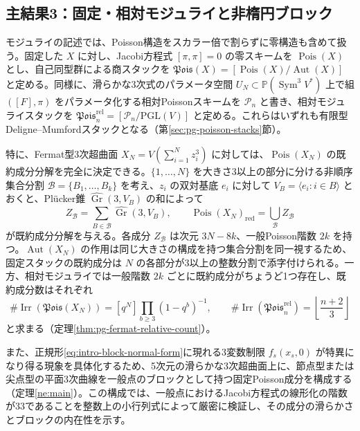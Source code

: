\subsection*{主結果3：固定・相対モジュライと非楕円ブロック}
モジュライの記述では、Poisson構造をスカラー倍で割らずに零構造も含めて扱う。固定した $X$ に対し、Jacobi方程式 $[\pi,\pi]=0$ の零スキームを $\operatorname{Pois}(X)$ とし、自己同型群による商スタックを $\mathfrak{Pois}(X)=[\operatorname{Pois}(X)/\operatorname{Aut}(X)]$ と定める。同様に、滑らかな3次式のパラメータ空間 $U_N\subset\mathbb P(\operatorname{Sym}^3V^*)$ 上で組 $([F],\pi)$ をパラメータ化する相対Poissonスキームを $\mathscr P_n$ と書き、相対モジュライスタックを $\mathfrak{Pois}^{\mathrm{rel}}_n=[\mathscr P_n/\mathrm{PGL}(V)]$ と定める。これらはいずれも有限型Deligne--Mumfordスタックとなる（第\ref{sec:pg-poisson-stacks}節）。

特に、Fermat型3次超曲面 $X_N=V(\sum_{i=1}^N z_i^3)$ に対しては、$\operatorname{Pois}(X_N)$ の既約成分分解を完全に決定できる。$\{1,\ldots,N\}$ を大きさ3以上の部分に分ける非順序集合分割 $\mathcal B=\{B_1,\ldots,B_k\}$ を考え、$z_i$ の双対基底 $e_i$ に対して $V_B=\langle e_i:i\in B\rangle$ とおくと、Pl\"ucker錐 $\widehat{\operatorname{Gr}}(3,V_B)$ の和によって
\begin{equation}\label{eq:intro-fermat-components}
Z_{\mathcal B}=\sum_{B\in\mathcal B}\widehat{\operatorname{Gr}}(3,V_B),
\qquad\operatorname{Pois}(X_N)_{\mathrm{red}}=\bigcup_{\mathcal B}Z_{\mathcal B}
\end{equation}
が既約成分分解を与える。各成分 $Z_{\mathcal B}$ は次元 $3N-8k$、一般Poisson階数 $2k$ を持つ。$\operatorname{Aut}(X_N)$ の作用は同じ大きさの構成を持つ集合分割を同一視するため、固定スタックの既約成分は $N$ の各部分が3以上の整数分割で添字付けられる。一方、相対モジュライでは一般階数 $2k$ ごとに既約成分がちょうど1つ存在し、既約成分数はそれぞれ
\begin{equation}\label{eq:intro-poisson-stack-counts}
\#\operatorname{Irr}(\mathfrak{Pois}(X_N))
=[q^N]\prod_{b\ge3}(1-q^b)^{-1},\qquad
\#\operatorname{Irr}(\mathfrak{Pois}^{\mathrm{rel}}_n)
=\left\lfloor\frac{n+2}{3}\right\rfloor
\end{equation}
と求まる（定理\ref{thm:pg-fermat-relative-count}）。

また、正規形\eqref{eq:intro-block-normal-form}に現れる3変数制限 $f_s(x_s,0)$ が特異になり得る現象を具体化するため、5次元の滑らかな3次超曲面上に、節点型または尖点型の平面3次曲線を一般点のブロックとして持つ固定Poisson成分を構成する（定理\ref{ne:main}）。この構成では、一般点におけるJacobi方程式の線形化の階数が33であることを整数上の小行列式によって厳密に検証し、その成分の滑らかさとブロックの内在性を示す。

